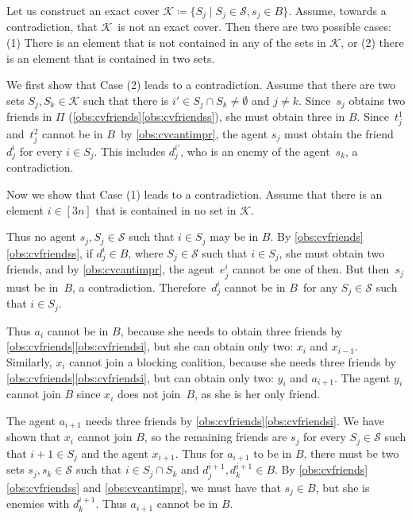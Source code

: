 \documentclass[a4paper,fleqn]{cas-sc}
\newcommand{\partition}{\ensuremath{\Pi}\xspace}
\newcommand{\blockingCoalition}{\ensuremath{B}\xspace}
\newcommand{\sets}{\ensuremath{\mathcal{S}}}
\newcommand{\elements}{\ensuremath{[3n]}}
\newcommand{\sset}[1]{\ensuremath{S_{#1}}}
\newcommand{\ecov}{\ensuremath{\mathcal{K}}}
\begin{document}
{Let us construct an exact cover $\ecov \coloneqq \{\sset j \mid \sset j \in \sets, s_j \in \blockingCoalition\}$.
Assume, towards a contradiction, that \ecov\ is not an exact cover.
Then there are two possible cases: (1) There is an element that is not contained in any of the sets in \ecov, or (2) there is an element that is contained in two sets.

We first show that Case (2) leads to a contradiction.
Assume that there are two sets $\sset j, \sset k \in \ecov$ such that there is $i' \in \sset j \cap \sset k \neq \emptyset$ and $j \neq k$.
Since~$s_j$ obtains two friends in $\partition$ (\cref{obs:cvfriends}\eqref{obs:cvfriendss}), she must obtain three in \blockingCoalition. 
Since~$t^1_j$ and~$t^2_j$ cannot be in \blockingCoalition\ by \cref{obs:cvcantimpr}, the agent $s_j$ must obtain the friend~$d^{i}_j$ for every $i \in \sset j$. This includes $d^{i'}_j$, who is an enemy of the agent~$s_k$, a contradiction.

Now we show that Case (1) leads to a contradiction.
Assume that there is an element $i \in \elements$ that is contained in no set in \ecov. 

Thus no agent $s_j, \sset j \in \sets$ such that $i \in \sset j$ may be in \blockingCoalition.
By \cref{obs:cvfriends}\eqref{obs:cvfriendss}, if $d^i_j \in \blockingCoalition$, where $\sset j \in \sets$ such that $i \in \sset j$, she must obtain two friends, and by \cref{obs:cvcantimpr}, the agent~$e^i_j$ cannot be one of then. But then~$s_j$ must be in~\blockingCoalition, a contradiction.
Therefore~$d^i_j$ cannot be in \blockingCoalition\ for any $\sset j \in \sets$ such that $i \in \sset j$.

Thus $a_i$ cannot be in \blockingCoalition, because she needs to obtain three friends by \cref{obs:cvfriends}\eqref{obs:cvfriendsi}, but she can obtain only two: $x_i$ and $x_{i - 1}$.
Similarly, $x_i$ cannot join a blocking coalition, because she needs three friends by \cref{obs:cvfriends}\eqref{obs:cvfriendsi}, but can obtain only two: $y_i$ and $a_{i + 1}$.
The agent $y_i$ cannot join \blockingCoalition since $x_i$ does not join~\blockingCoalition, as she is her only friend.

The agent $a_{i + 1}$ needs three friends by \cref{obs:cvfriends}\eqref{obs:cvfriendsi}.
We have shown that $x_i$ cannot join \blockingCoalition, so the remaining friends are $s_j$ for every $\sset j \in \sets$ such that $i + 1 \in \sset j$ and the agent $x_{i + 1}$.
Thus for $a_{i + 1}$ to be in \blockingCoalition, there must be two sets $s_j, s_k \in \sets$ such that $i \in \sset j \cap \sset k$ and $d^{i + 1}_j, d^{i + 1}_k \in \blockingCoalition$.
By \cref{obs:cvfriends}\eqref{obs:cvfriendss} and \cref{obs:cvcantimpr}, we must have that $s_j \in \blockingCoalition$, but she is enemies with $d^{i + 1}_k$.
Thus $a_{i + 1}$ cannot be in \blockingCoalition.

}
\end{document}

